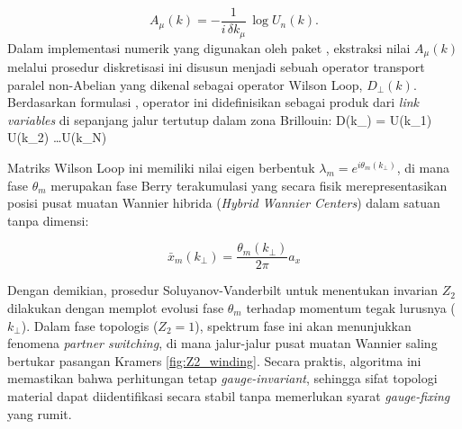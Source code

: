 \[
A_\mu(k) 
= -\frac{1}{i\,\delta k_\mu}\,\log U_n(k).
\]
Dalam implementasi numerik yang digunakan oleh paket \parencite{Cole_Python_Tight_Binding_2025}, ekstraksi nilai $A_{\mu}(k)$ melalui prosedur diskretisasi ini disusun menjadi sebuah operator transport paralel non-Abelian yang dikenal sebagai operator Wilson Loop, $D_{\perp}(k)$. Berdasarkan formulasi \parencite{PhysRevB.84.075119}, operator ini didefinisikan sebagai produk dari \textit{link variables} di sepanjang jalur tertutup dalam zona Brillouin:
D(k_\perp) = U(k_1) U(k_2) \dots U(k_N)
\]

Matriks Wilson Loop ini memiliki nilai eigen berbentuk $\lambda_m = e^{i\theta_m(k_\perp)}$, di mana fase $\theta_m$ merupakan fase Berry terakumulasi yang secara fisik merepresentasikan posisi pusat muatan Wannier hibrida (\textit{Hybrid Wannier Centers}) dalam satuan tanpa dimensi:

\[
\bar{x}_m(k_\perp) = \frac{\theta_m(k_\perp)}{2\pi} a_x
\]

Dengan demikian, prosedur Soluyanov-Vanderbilt untuk menentukan invarian $Z_2$ dilakukan dengan memplot evolusi fase $\theta_m$ terhadap momentum tegak lurusnya ($k_\perp$). Dalam fase topologis ($Z_2=1$), spektrum fase ini akan menunjukkan fenomena \textit{partner switching}, di mana jalur-jalur pusat muatan Wannier saling bertukar pasangan Kramers \ref{fig:Z2_winding}. Secara praktis, algoritma ini memastikan bahwa perhitungan tetap \textit{gauge-invariant}, sehingga sifat topologi material dapat diidentifikasi secara stabil tanpa memerlukan syarat \textit{gauge-fixing} yang rumit.

